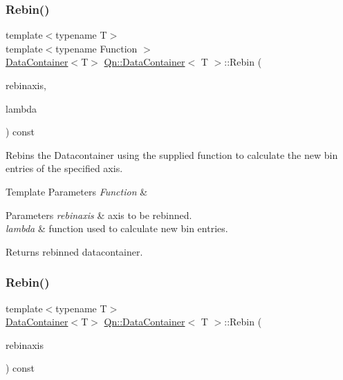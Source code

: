 \subsubsection{\texorpdfstring{Rebin()}{Rebin()}\hspace{0.1cm}{\footnotesize\ttfamily [1/2]}}
{\footnotesize\ttfamily template$<$typename T$>$ \\
template$<$typename Function $>$ \\
\mbox{\hyperlink{classQn_1_1DataContainer}{Data\+Container}}$<$T$>$ \mbox{\hyperlink{classQn_1_1DataContainer}{Qn\+::\+Data\+Container}}$<$ T $>$\+::Rebin (\begin{DoxyParamCaption}\item[{const \mbox{\hyperlink{classQn_1_1Axis}{Axis}} \&}]{rebinaxis,  }\item[{Function \&\&}]{lambda }\end{DoxyParamCaption}) const\hspace{0.3cm}{\ttfamily [inline]}}

Rebins the Datacontainer using the supplied function to calculate the new bin entries of the specified axis. 
\begin{DoxyTemplParams}{Template Parameters}
{\em Function} & \\
\hline
\end{DoxyTemplParams}

\begin{DoxyParams}{Parameters}
{\em rebinaxis} & axis to be rebinned. \\
\hline
{\em lambda} & function used to calculate new bin entries. \\
\hline
\end{DoxyParams}
\begin{DoxyReturn}{Returns}
rebinned datacontainer. 
\end{DoxyReturn}
\mbox{\label{classQn_1_1DataContainer_a775225cf7b6e9bd66c7571531013c07d}} 
\subsubsection{\texorpdfstring{Rebin()}{Rebin()}\hspace{0.1cm}{\footnotesize\ttfamily [2/2]}}
{\footnotesize\ttfamily template$<$typename T$>$ \\
\mbox{\hyperlink{classQn_1_1DataContainer}{Data\+Container}}$<$T$>$ \mbox{\hyperlink{classQn_1_1DataContainer}{Qn\+::\+Data\+Container}}$<$ T $>$\+::Rebin (\begin{DoxyParamCaption}\item[{const \mbox{\hyperlink{classQn_1_1Axis}{Axis}} \&}]{rebinaxis }\end{DoxyParamCaption}) const\hspace{0.3cm}{\ttfamily [inline]}}

